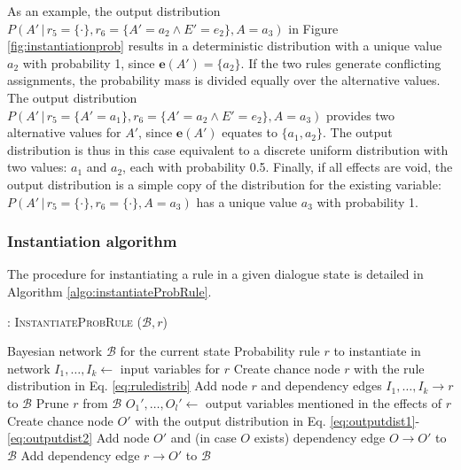 As an example, the output distribution $P(A' \, | \, r_5\!=\!\{\cdot\},r_6\!=\!\{A'\!=\!a_2 \land E'\!=\!e_2\}, A\!=\!a_3)$ in Figure \ref{fig:instantiationprob} results in a deterministic distribution with a unique value $a_2$ with probability 1, since $\mathbf{e}(A') = \{a_2\}$. If the two rules generate conflicting assignments, the probability mass is divided equally over the alternative values.   The output distribution $P(A' \, | \, r_5\!=\!\{A'\!=\!a_1\},r_6\!=\!\{A'\!=\!a_2 \land E'\!=\!e_2\}, A\!=\!a_3)$ provides two alternative values for $A'$, since $\mathbf{e}(A')$ equates to $\{a_1,a_2\}$. The output distribution is thus in this case equivalent to a discrete uniform distribution with two values: $a_1$ and $a_2$, each with probability 0.5. Finally, if all effects are void, the output distribution is a simple copy of the distribution for the existing variable: $P(A' \, | \, r_5\!=\!\{\cdot\},r_6\!=\!\{\cdot\}, A\!=\!a_3)$ has a unique value $a_3$ with probability 1. 



\subsubsection*{Instantiation algorithm} 
\label{sec:utilruleinstantiation}

The procedure for instantiating a rule in a given dialogue state is detailed in Algorithm \ref{algo:instantiateProbRule}. 

\begin{algorithm}[h!]
\caption{: \textsc{InstantiateProbRule} ($\mathcal{B}, \mathit{r}$)}
\begin{algorithmic}[1] \vspace{1mm}
\REQUIRE Bayesian network $\mathcal{B}$ for the current state
\REQUIRE Probability rule $\mathit{r}$ to instantiate in network  \vspace{1mm}
\STATE $I_1, \dots, I_k \leftarrow$ input variables for $\mathit{r}$
\STATE Create chance node $r$ with the rule distribution in Eq. \eqref{eq:ruledistrib}
\STATE Add node $r$ and dependency edges $I_1, \dots, I_k \rightarrow r$ to $\mathcal{B}$ 
\STATE Prune $r$ from $\mathcal{B}$
\ELSE
\STATE $O_1', \dots, O_l' \leftarrow$ output variables mentioned in the effects of $r$
\STATE Create chance node $O'$ with the output distribution in Eq. \eqref{eq:outputdist1}-\eqref{eq:outputdist2}
\STATE Add node $O'$ and (in case $O$ exists) dependency edge $O \rightarrow O'$ to $\mathcal{B}$
\ENDIF
\STATE Add dependency edge $r \rightarrow O'$ to $\mathcal{B}$ 
\ENDFOR
\ENDIF
\end{algorithmic}
\label{algo:instantiateProbRule}
\end{algorithm}

